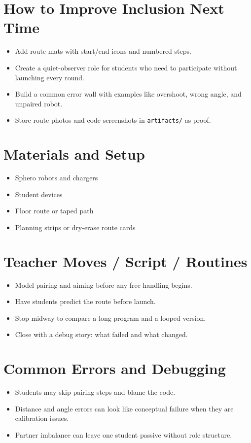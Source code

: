 \documentclass[11pt]{article}
\begin{document}
\section*{How to Improve Inclusion Next Time}
\begin{itemize}[leftmargin=*]
\item Add route mats with start/end icons and numbered steps.
\item Create a quiet-observer role for students who need to participate without launching every round.
\item Build a common error wall with examples like overshoot, wrong angle, and unpaired robot.
\item Store route photos and code screenshots in \texttt{artifacts/} as proof.
\end{itemize}

\section*{Materials and Setup}
\begin{itemize}[leftmargin=*]
\item Sphero robots and chargers
\item Student devices
\item Floor route or taped path
\item Planning strips or dry-erase route cards
\end{itemize}

\section*{Teacher Moves / Script / Routines}
\begin{itemize}[leftmargin=*]
\item Model pairing and aiming before any free handling begins.
\item Have students predict the route before launch.
\item Stop midway to compare a long program and a looped version.
\item Close with a debug story: what failed and what changed.
\end{itemize}

\section*{Common Errors and Debugging}
\begin{itemize}[leftmargin=*]
\item Students may skip pairing steps and blame the code.
\item Distance and angle errors can look like conceptual failure when they are calibration issues.
\item Partner imbalance can leave one student passive without role structure.
\end{itemize}
\end{document}
